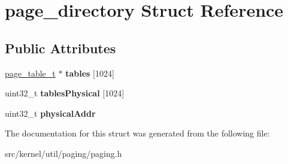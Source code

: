 \hypertarget{structpage__directory}{}\section{page\+\_\+directory Struct Reference}
\label{structpage__directory}
\subsection*{Public Attributes}
\begin{DoxyCompactItemize}
\item 
\mbox{\label{structpage__directory_a84d1c51d205ba38ef8356fda66065877}} 
\hyperlink{structpage__table}{page\+\_\+table\+\_\+t} $\ast$ {\bfseries tables} \mbox{[}1024\mbox{]}
\item 
\mbox{\label{structpage__directory_a36e32a2f0c239c599f064653f2d07ab8}} 
uint32\+\_\+t {\bfseries tables\+Physical} \mbox{[}1024\mbox{]}
\item 
\mbox{\label{structpage__directory_a9cf43d86570bbd6bc2a211e47b0909d5}} 
uint32\+\_\+t {\bfseries physical\+Addr}
\end{DoxyCompactItemize}


The documentation for this struct was generated from the following file\+:\begin{DoxyCompactItemize}
\item 
src/kernel/util/paging/paging.\+h\end{DoxyCompactItemize}
